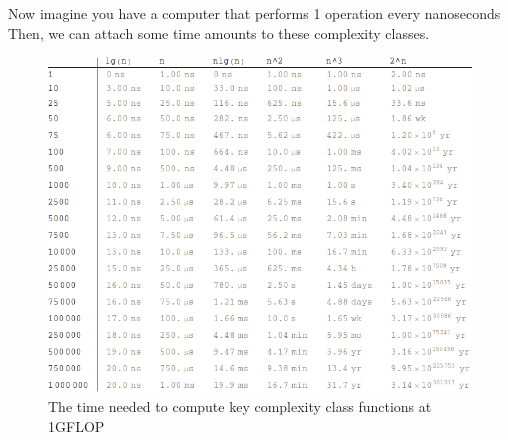 \documentclass[]{tufte-handout}
\begin{document}
Now imagine you have a computer that performs 1 operation every nanoseconds Then, we can attach some time amounts to these complexity classes.
\begin{figure}
\includegraphics[scale=0.45]{timevals.png}
\caption{The time needed to compute key complexity class functions at 1GFLOP}
\end{figure}
\end{document}
